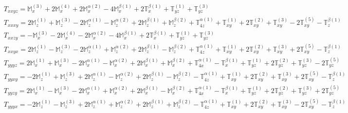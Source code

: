 \documentclass[fleqn,8pt,landscape]{jsarticle}
\begin{document}
\begin{align*}
& T_{xxyz} = \mathbb{M}_{x}^{(3)} + 2 \mathbb{M}_{x}^{(4)} + 2 \mathbb{M}_{x}^{\alpha(2)} - 4 \mathbb{M}_{x}^{\beta(1)} + 2 \mathbb{T}_{x}^{\beta(1)} + \mathbb{T}_{yz}^{(1)} + \mathbb{T}_{yz}^{(3)} \\
& T_{xxxy} = 2 \mathbb{M}_{z}^{(1)} + \mathbb{M}_{z}^{(3)} - 2 \mathbb{M}_{z}^{\alpha(1)} - \mathbb{M}_{z}^{\alpha(2)} + 2 \mathbb{M}_{z}^{\beta(1)} + \mathbb{M}_{z}^{\beta(2)} + \mathbb{T}_{4z}^{\alpha(1)} + \mathbb{T}_{xy}^{(1)} + 2 \mathbb{T}_{xy}^{(2)} + \mathbb{T}_{xy}^{(3)} - 2 \mathbb{T}_{xy}^{(5)} - \mathbb{T}_{z}^{\beta(1)} \\
& T_{xxzy} = - \mathbb{M}_{x}^{(3)} - 2 \mathbb{M}_{x}^{(4)} - 2 \mathbb{M}_{x}^{\alpha(2)} - 4 \mathbb{M}_{x}^{\beta(1)} + 2 \mathbb{T}_{x}^{\beta(1)} + \mathbb{T}_{yz}^{(1)} + \mathbb{T}_{yz}^{(3)} \\
& T_{xxyx} = 2 \mathbb{M}_{z}^{(1)} - \mathbb{M}_{z}^{(3)} - 2 \mathbb{M}_{z}^{\alpha(1)} + \mathbb{M}_{z}^{\alpha(2)} + 2 \mathbb{M}_{z}^{\beta(1)} - \mathbb{M}_{z}^{\beta(2)} + \mathbb{T}_{4z}^{\alpha(1)} + \mathbb{T}_{xy}^{(1)} + 2 \mathbb{T}_{xy}^{(2)} + \mathbb{T}_{xy}^{(3)} + 2 \mathbb{T}_{xy}^{(5)} - \mathbb{T}_{z}^{\beta(1)} \\
& T_{yyyz} = 2 \mathbb{M}_{x}^{(1)} + \mathbb{M}_{x}^{(3)} - 2 \mathbb{M}_{x}^{\alpha(1)} - \mathbb{M}_{x}^{\alpha(2)} + 2 \mathbb{M}_{x}^{\beta(1)} + \mathbb{M}_{x}^{\beta(2)} + \mathbb{T}_{4x}^{\alpha(1)} - \mathbb{T}_{x}^{\beta(1)} + \mathbb{T}_{yz}^{(1)} + 2 \mathbb{T}_{yz}^{(2)} + \mathbb{T}_{yz}^{(3)} - 2 \mathbb{T}_{yz}^{(5)} \\
& T_{yyxy} = - 2 \mathbb{M}_{z}^{(1)} + \mathbb{M}_{z}^{(3)} + 2 \mathbb{M}_{z}^{\alpha(1)} - \mathbb{M}_{z}^{\alpha(2)} + 2 \mathbb{M}_{z}^{\beta(1)} - \mathbb{M}_{z}^{\beta(2)} - \mathbb{T}_{4z}^{\alpha(1)} + \mathbb{T}_{xy}^{(1)} + 2 \mathbb{T}_{xy}^{(2)} + \mathbb{T}_{xy}^{(3)} + 2 \mathbb{T}_{xy}^{(5)} - \mathbb{T}_{z}^{\beta(1)} \\
& T_{yyzy} = 2 \mathbb{M}_{x}^{(1)} - \mathbb{M}_{x}^{(3)} - 2 \mathbb{M}_{x}^{\alpha(1)} + \mathbb{M}_{x}^{\alpha(2)} + 2 \mathbb{M}_{x}^{\beta(1)} - \mathbb{M}_{x}^{\beta(2)} + \mathbb{T}_{4x}^{\alpha(1)} - \mathbb{T}_{x}^{\beta(1)} + \mathbb{T}_{yz}^{(1)} + 2 \mathbb{T}_{yz}^{(2)} + \mathbb{T}_{yz}^{(3)} + 2 \mathbb{T}_{yz}^{(5)} \\
& T_{yyyx} = - 2 \mathbb{M}_{z}^{(1)} - \mathbb{M}_{z}^{(3)} + 2 \mathbb{M}_{z}^{\alpha(1)} + \mathbb{M}_{z}^{\alpha(2)} + 2 \mathbb{M}_{z}^{\beta(1)} + \mathbb{M}_{z}^{\beta(2)} - \mathbb{T}_{4z}^{\alpha(1)} + \mathbb{T}_{xy}^{(1)} + 2 \mathbb{T}_{xy}^{(2)} + \mathbb{T}_{xy}^{(3)} - 2 \mathbb{T}_{xy}^{(5)} - \mathbb{T}_{z}^{\beta(1)} \\

\end{align*}
\end{document}
